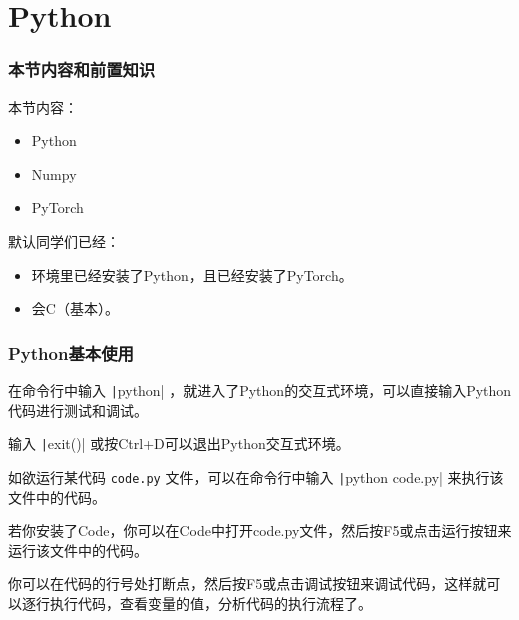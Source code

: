 % 
%
%

\section{Python}

\begin{frame}
    \frametitle{本节内容和前置知识}

    本节内容：
    \begin{itemize}
        \item Python
        \item Numpy
        \item PyTorch
    \end{itemize}

    默认同学们已经：
    \begin{itemize}
        \item 环境里已经安装了Python，且已经安装了PyTorch。
        \item 会C（基本）。
    \end{itemize}

\end{frame}

\begin{frame}[fragile]
    \frametitle{Python基本使用}

    在命令行中输入 \texttt|python| ，就进入了Python的交互式环境，可以直接输入Python代码进行测试和调试。

    输入 \texttt|exit()| 或按Ctrl+D可以退出Python交互式环境。

    如欲运行某代码 \verb|code.py| 文件，可以在命令行中输入 \texttt|python code.py| 来执行该文件中的代码。

    若你安装了Code，你可以在Code中打开code.py文件，然后按F5或点击运行按钮来运行该文件中的代码。

    你可以在代码的行号处打断点，然后按F5或点击调试按钮来调试代码，这样就可以逐行执行代码，查看变量的值，分析代码的执行流程了。

\end{frame}

